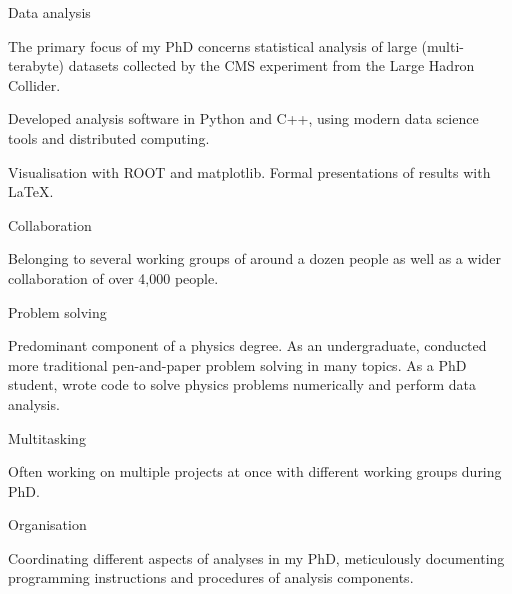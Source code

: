 \begin{cventries}

    \cventry
    {} %
    {Data analysis} %
    {} %
    {} %
    {
      \begin{cvitems}
        \item {The primary focus of my PhD concerns statistical analysis of large (multi-terabyte) datasets collected by the CMS experiment from the Large Hadron Collider.}
        \item {Developed analysis software in Python and C++, using modern data science tools and distributed computing.}
        \item{Visualisation with ROOT and matplotlib. Formal presentations of results with LaTeX.}
        \vpadding
        \end{cvitems}
        }

    \cventry
    {} %
    {Collaboration} %
    {} %
    {} %
    {
      \begin{cvitems}
        \item {Belonging to several working groups of around a dozen people as well as a wider collaboration of over 4,000 people.}
        \vpadding
        \end{cvitems}
        }

    \cventry
    {} %
    {Problem solving} %
    {} %
    {} %
    {
      \begin{cvitems}
        \item {Predominant component of a physics degree. As an undergraduate, conducted more traditional pen-and-paper problem solving in many topics. As a PhD student, wrote code to solve physics problems numerically and perform data analysis.}
        \vpadding
        \end{cvitems}
        }

    \cventry
    {} %
    {Multitasking} %
    {} %
    {} %
    {
      \begin{cvitems}
        \item {Often working on multiple projects at once with different working groups during PhD.}
        \vpadding
        \end{cvitems}
        }

    \cventry
    {} %
    {Organisation} %
    {} %
    {} %
    {
      \begin{cvitems}
        \item {Coordinating different aspects of analyses in my PhD, meticulously documenting programming instructions and procedures of analysis components.}
        \vpadding
        \end{cvitems}
        }

\end{cventries}

